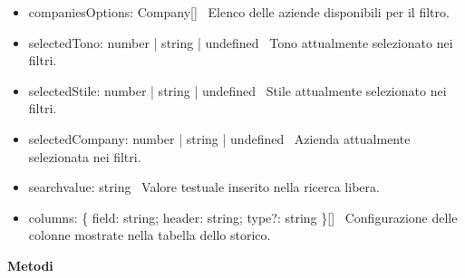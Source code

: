 \documentclass[a4paper,11pt]{article}
\begin{document}
\begin{itemize}[noitemsep, topsep=0pt]
\item companiesOptions: Company[]  \
Elenco delle aziende disponibili per il filtro.

\item selectedTono: number | string | undefined  \
Tono attualmente selezionato nei filtri.

\item selectedStile: number | string | undefined  \
Stile attualmente selezionato nei filtri.

\item selectedCompany: number | string | undefined  \
Azienda attualmente selezionata nei filtri.

\item searchvalue: string  \
Valore testuale inserito nella ricerca libera.

\item columns: \{ field: string; header: string; type?: string \}[]  \
Configurazione delle colonne mostrate nella tabella dello storico.
\end{itemize}

\textbf{Metodi}
\end{document}
